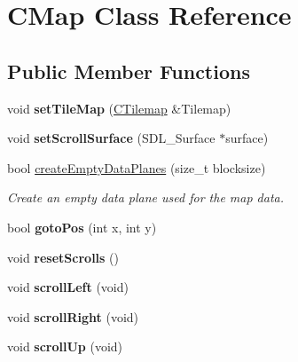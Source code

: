 \hypertarget{class_c_map}{
\section{CMap Class Reference}
\label{class_c_map}
}
\subsection*{Public Member Functions}
\begin{DoxyCompactItemize}
\item 
\hypertarget{class_c_map_ac2147afb2017c418b3478db4f2830b62}{
void {\bfseries setTileMap} (\hyperlink{class_c_tilemap}{CTilemap} \&Tilemap)}
\label{class_c_map_ac2147afb2017c418b3478db4f2830b62}

\item 
\hypertarget{class_c_map_ad05e7a51c2c032150c80f0c1fa816b1b}{
void {\bfseries setScrollSurface} (SDL\_\-Surface $\ast$surface)}
\label{class_c_map_ad05e7a51c2c032150c80f0c1fa816b1b}

\item 
bool \hyperlink{class_c_map_a5f80960c9d557322ac0c887dd3d39a6c}{createEmptyDataPlanes} (size\_\-t blocksize)
\begin{DoxyCompactList}\small\item\em Create an empty data plane used for the map data. \item\end{DoxyCompactList}\item 
\hypertarget{class_c_map_a2dcc49bc7503f6d81c783c67aa01cf5c}{
bool {\bfseries gotoPos} (int x, int y)}
\label{class_c_map_a2dcc49bc7503f6d81c783c67aa01cf5c}

\item 
\hypertarget{class_c_map_ac3af64e4e3c4f208be224c70cfe43658}{
void {\bfseries resetScrolls} ()}
\label{class_c_map_ac3af64e4e3c4f208be224c70cfe43658}

\item 
\hypertarget{class_c_map_ac9b4909fcdd38a3907ada18bfcebfb42}{
void {\bfseries scrollLeft} (void)}
\label{class_c_map_ac9b4909fcdd38a3907ada18bfcebfb42}

\item 
\hypertarget{class_c_map_a854acc4e55436eac9d05183f2104a6ce}{
void {\bfseries scrollRight} (void)}
\label{class_c_map_a854acc4e55436eac9d05183f2104a6ce}

\item 
\hypertarget{class_c_map_a45cfc36dbe800477a28754ae9e4ce6b3}{
void {\bfseries scrollUp} (void)}
\label{class_c_map_a45cfc36dbe800477a28754ae9e4ce6b3}


\end{DoxyCompactItemize}
